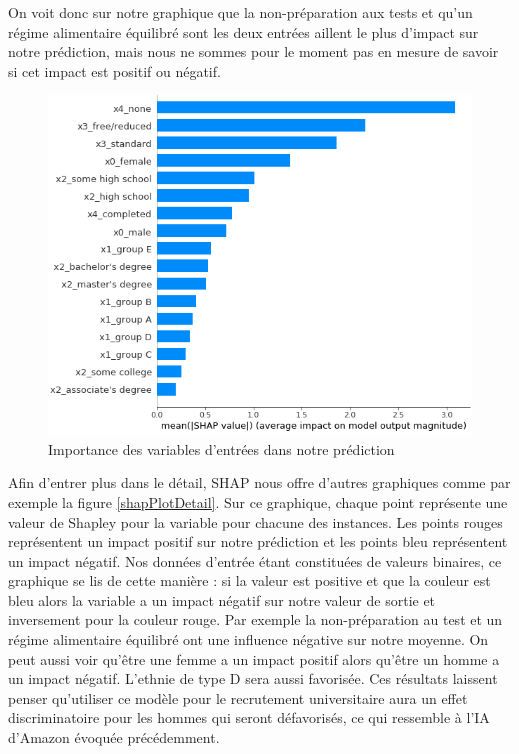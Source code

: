 On voit donc sur notre graphique que la non-préparation aux tests et qu'un régime alimentaire équilibré sont les deux entrées aillent le plus d'impact sur notre prédiction, mais nous ne sommes pour le moment pas en mesure de savoir si cet impact est positif ou négatif.
\newpage
\begin{figure}[h]
    \includegraphics[scale=0.6]{src_img/shapPlotBar.png}
    \caption{Importance des variables d'entrées dans notre prédiction}
    \label{shapPlotBar}
\end{figure}
Afin d'entrer plus dans le détail, SHAP nous offre d'autres graphiques comme par exemple la figure \ref{shapPlotDetail}. Sur ce graphique, chaque point représente une valeur de Shapley pour la variable pour chacune des instances. Les points rouges représentent un impact positif sur notre prédiction et les points bleu représentent un impact négatif. Nos données d'entrée étant constituées de valeurs binaires, ce graphique se lis de cette manière : si la valeur est positive et que la couleur est bleu alors la variable a un impact négatif sur notre valeur de sortie et inversement pour la couleur rouge. Par exemple la non-préparation au test et un régime alimentaire équilibré ont une influence négative sur notre moyenne. On peut aussi voir qu'être une femme a un impact positif alors qu'être un homme a un impact négatif. L’ethnie de type D sera aussi favorisée. Ces résultats laissent penser qu'utiliser ce modèle pour le recrutement universitaire aura un effet discriminatoire pour les hommes qui seront défavorisés, ce qui ressemble à l’IA d’Amazon évoquée précédemment.
